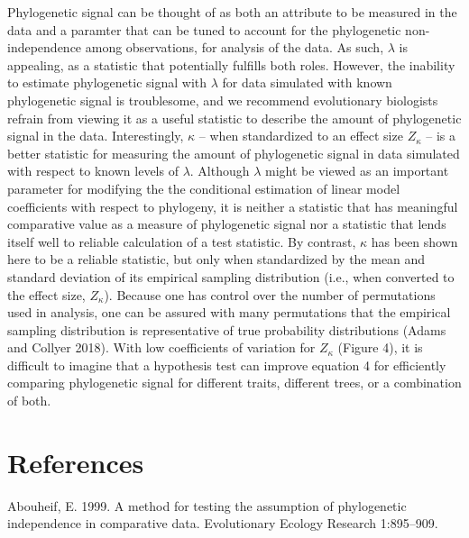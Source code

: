 \documentclass[
]{article}
\begin{document}
Phylogenetic signal can be thought of as both an attribute to be
measured in the data and a paramter that can be tuned to account for the
phylogenetic non-independence among observations, for analysis of the
data. As such, \(\lambda\) is appealing, as a statistic that potentially
fulfills both roles. However, the inability to estimate phylogenetic
signal with \(\lambda\) for data simulated with known phylogenetic
signal is troublesome, and we recommend evolutionary biologists refrain
from viewing it as a useful statistic to describe the amount of
phylogenetic signal in the data. Interestingly, \(\kappa\) -- when
standardized to an effect size \(Z_\kappa\) -- is a better statistic for
measuring the amount of phylogenetic signal in data simulated with
respect to known levels of \(\lambda\). Although \(\lambda\) might be
viewed as an important parameter for modifying the the conditional
estimation of linear model coefficients with respect to phylogeny, it is
neither a statistic that has meaningful comparative value as a measure
of phylogenetic signal nor a statistic that lends itself well to
reliable calculation of a test statistic. By contrast, \(\kappa\) has
been shown here to be a reliable statistic, but only when standardized
by the mean and standard deviation of its empirical sampling
distribution (i.e., when converted to the effect size, \(Z_\kappa\)).
Because one has control over the number of permutations used in
analysis, one can be assured with many permutations that the empirical
sampling distribution is representative of true probability
distributions (Adams and Collyer 2018). With low coefficients of
variation for \(Z_\kappa\) (Figure 4), it is difficult to imagine that a
hypothesis test can improve equation 4 for efficiently comparing
phylogenetic signal for different traits, different trees, or a
combination of both.

\newpage

\hypertarget{references}{%
\section{References}\label{references}}

\setlength{\parindent}{-0.25in} \setlength{\leftskip}{0.25in}
\setlength{\parskip}{8pt} \noindent

\hypertarget{refs}{}
\leavevmode\hypertarget{ref-Abouheif1999}{}%
Abouheif, E. 1999. A method for testing the assumption of phylogenetic
independence in comparative data. Evolutionary Ecology Research
1:895--909.
\end{document}
